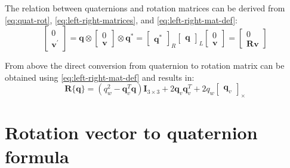 The relation between quaternions and rotation matrices can be derived from \eqref{eq:quat-rot}, \eqref{eq:left-right-matrices}, and \eqref{eq:left-right-mat-def}:
\begin{equation}
    \begin{bmatrix}
        0 \\ 
        \mathbf{v}^{'}
    \end{bmatrix}=\mathbf{q}\otimes\begin{bmatrix}
        0 \\ 
        \mathbf{v}
    \end{bmatrix}\otimes\mathbf{q}^*=\begin{bmatrix}\mathbf{q}^*\end{bmatrix}_R\begin{bmatrix}\mathbf{q}\end{bmatrix}_L\begin{bmatrix}
        0 \\ \mathbf{v}\end{bmatrix}=\begin{bmatrix}
            0\\ \mathbf{R}\mathbf{v}
        \end{bmatrix}
\label{eq:quat-rotmat-relation}
\end{equation}

From above the direct conversion from quaternion to rotation matrix can be obtained using \eqref{eq:left-right-mat-def} and results in:
\begin{equation}
    \mathbf{R}\{\mathbf{q}\}=(q_w^2-\mathbf{q}_v^T\mathbf{q})\mathbf{I}_{3\times 3}+2\mathbf{q}_v\mathbf{q}_v^T+2q_w\begin{bmatrix}
        \mathbf{q}_v\end{bmatrix}_\times
\label{eq:quat2rotmat}
\end{equation}

\section{Rotation vector to quaternion formula}
\label{app:rotvec2quat}

